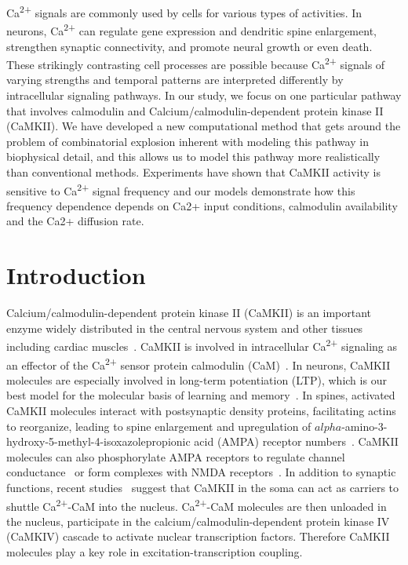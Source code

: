 \documentclass[10pt,letterpaper]{article}
\begin{document}
Ca\textsuperscript{2+} signals are commonly used by cells for various types of activities. In neurons, Ca\textsuperscript{2+} can regulate gene expression and dendritic spine enlargement, strengthen synaptic connectivity, and promote neural growth or even death. These strikingly contrasting cell processes are possible because Ca\textsuperscript{2+} signals of varying strengths and temporal patterns are interpreted differently by intracellular signaling pathways. In our study, we focus on one particular pathway that involves calmodulin and Calcium/calmodulin-dependent protein kinase II (CaMKII). We have developed a new computational method that gets around the problem of combinatorial explosion inherent with modeling this pathway in biophysical detail, and this allows us to model this pathway more realistically than conventional methods. Experiments have shown that CaMKII activity is sensitive to Ca\textsuperscript{2+} signal frequency and our models demonstrate how this frequency dependence depends on Ca2+ input conditions, calmodulin availability and the Ca2+ diffusion rate.

\linenumbers
\section*{Introduction}
Calcium/calmodulin-dependent protein kinase II (CaMKII) is an important enzyme widely distributed in the central nervous system and other tissues including cardiac muscles~\cite{Wayman:2008gla,Lisman:2002ki,Erickson:2014fs}. CaMKII is involved in intracellular Ca\textsuperscript{2+} signaling as an effector of the Ca\textsuperscript{2+} sensor protein calmodulin (CaM)~\cite{Herring:2016bh,Hell:2014bd,Coultrap:2012ip}. In neurons, CaMKII molecules are especially involved in long-term potentiation (LTP), which is our best model for the molecular basis of learning and memory~\cite{Bliss:1973jg}. In spines, activated CaMKII molecules interact with postsynaptic density proteins, facilitating actins to reorganize, leading to spine enlargement and upregulation of $alpha$-amino-3-hydroxy-5-methyl-4-isoxazolepropionic acid (AMPA) receptor numbers~\cite{Herring:2016bh}. CaMKII molecules can also phosphorylate AMPA receptors to regulate channel conductance~\cite{Herring:2016bh,Coultrap:2012ip} or form complexes with NMDA receptors~\cite{Hell:2014bd}. In addition to synaptic functions, recent studies~\cite{Ma:2014dr,Li:2016cq} suggest that CaMKII in the soma can act as carriers to shuttle Ca\textsuperscript{2+}-CaM into the nucleus. Ca\textsuperscript{2+}-CaM molecules are then unloaded in the nucleus, participate in the calcium/calmodulin-dependent protein kinase IV (CaMKIV) cascade to activate nuclear transcription factors. Therefore CaMKII molecules play a key role in excitation-transcription coupling. 
\end{document}
